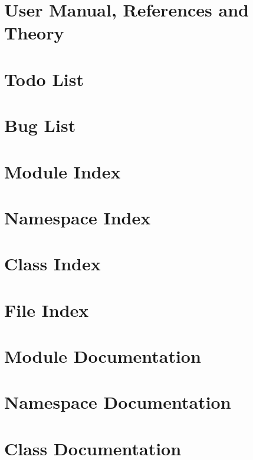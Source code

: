 \documentclass[twoside]{book}
\newcommand{\+}{\discretionary{\mbox{\scriptsize$\hookleftarrow$}}{}{}}
\begin{document}
\chapter{User Manual, References and Theory}
\label{page_ref_the}
\hypertarget{page_ref_the}{}

\chapter{Todo List}
\label{todo}
\hypertarget{todo}{}

\chapter{Bug List}
\label{bug}
\hypertarget{bug}{}

\chapter{Module Index}

\chapter{Namespace Index}

\chapter{Class Index}

\chapter{File Index}

\chapter{Module Documentation}







\chapter{Namespace Documentation}

\chapter{Class Documentation}



















\end{document}
